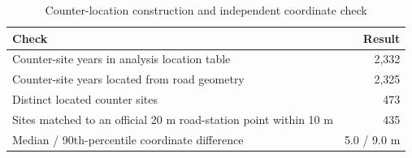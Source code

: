 \begin{table}[H]
\centering
\small
\caption{Counter-location construction and independent coordinate check}

\begin{tabularx}{0.9\textwidth}{Xr}
\toprule
Check & Result \\
\midrule
Counter-site years in analysis location table & 2,332 \\ \grayhline
Counter-site years located from road geometry & 2,325 \\ \grayhline
Distinct located counter sites & 473 \\ \grayhline
Sites matched to an official 20 m road-station point within 10 m & 435 \\ \grayhline
Median / 90th-percentile coordinate difference & 5.0 / 9.0 m \\
\bottomrule
\end{tabularx}
\end{table}
